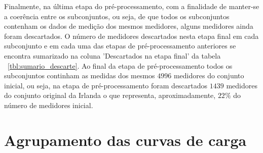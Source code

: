 Finalmente, na última etapa do pré-processamento, com a finalidade de manter-se a coerência entre os subconjuntos, ou seja, de que todos os subconjuntos contenham os dados de medição dos mesmos medidores, alguns medidores ainda foram descartados. O número de medidores descartados nesta etapa final em cada subconjunto e em cada uma das etapas de pré-processamento anteriores se encontra sumarizado na coluna 'Descartados na etapa final' da tabela ~\ref{tbl:sumario_descarte}. Ao final da etapa de pré-processamento todos os subconjuntos continham as medidas dos mesmos $4996$ medidores do conjunto inicial, ou seja, na etapa de pré-processamento foram descartados $1439$ medidores do conjunto original da Irlanda o que representa, aproximadamente, $22\%$ do número de medidores inicial.

\begin{center}
	\begin{table}			
		\caption{Tabela que sumariza os números de medidores descartados em cada uma das etapas de pré-processamento em cada um dos subconjuntos. Ao final, todos os subconjuntos contêm os mesmos $4996$ medidores. } 
		\end{table} \label{tbl:sumario_descarte}
\end{center}

\section{Agrupamento das curvas de carga}

